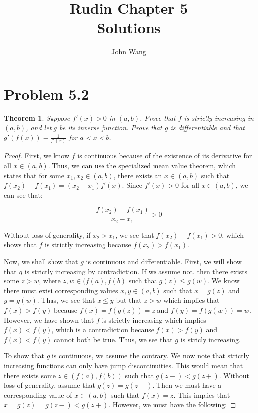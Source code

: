 \documentclass[psamsfonts]{amsart}
\title{Rudin Chapter 5\\
Solutions}
\author{John Wang}
\newtheorem{thm}{Theorem}[section]
\theoremstyle{definition}
\theoremstyle{remark}
\numberwithin{equation}{section}
\begin{document}
\maketitle

\section{Problem 5.2}

\begin{thm}
Suppose $f'(x) >0$ in $(a,b)$. Prove that $f$ is strictly increasing in $(a,b)$, and let $g$ be its inverse function. Prove that $g$ is differentiable and that $g'(f(x)) = \frac{1}{f'(x)}$ for $a < x < b$. 
\end{thm}

\begin{proof}
First, we know $f$ is continuous because of the existence of its derivative for all $x \in (a,b)$. Thus, we can use the specialized mean value theorem, which states that for some $x_1,x_2 \in (a,b)$, there exists an $x \in (a,b)$ such that $f(x_2) - f(x_1) = (x_2 - x_1) f'(x)$. Since $f'(x) > 0$ for all $x \in (a,b)$, we can see that:

\begin{equation}
\frac{f(x_2) - f(x_1)}{x_2 - x_1}> 0
\end{equation}

Without loss of generality, if $x_2 > x_1$, we see that $f(x_2) - f(x_1) > 0$, which shows that $f$ is strictly increasing because $f(x_2) > f(x_1)$. 

Now, we shall show that $g$ is continuous and differentiable. First, we will show that $g$ is strictly increasing by contradiction. If we assume not, then there exists some $z > w$, where $z,w \in (f(a),f(b)$ such that $g(z) \leq g(w)$. We know there must exist corresponding values $x,y \in (a,b)$ such that $x = g(z)$ and $y = g(w)$. Thus, we see that $x \leq y$ but that $z > w$ which implies that $f(x) > f(y)$ because $f(x) = f(g(z)) = z$ and $f(y) = f(g(w)) = w$. However, we have shown that $f$ is strictly increasing which implies $f(x) < f(y)$, which is a contradiction because $f(x) > f(y)$ and $f(x) < f(y)$ cannot both be true. Thus, we see that $g$ is stricly increasing.

To show that $g$ is continuous, we assume the contrary. We now note that strictly increasing functions can only have jump discontinuities. This would mean that there exists some $z \in (f(a),f(b))$ such that $g(z-) < g(z+)$. Without loss of generality, assume that $g(z) = g(z-)$. Then we must have a corresponding value of $x \in (a,b)$ such that $f(x) = z$. This implies that $x = g(z) = g(z-) < g(z+)$. However, we must have the following:


\end{proof}
\end{document}
